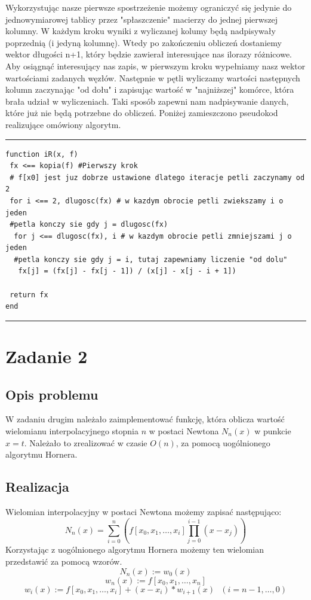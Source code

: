 \documentclass[]{article}
\begin{document}
Wykorzystując nasze pierwsze spostrzeżenie możemy ograniczyć się jedynie do jednowymiarowej tablicy przez "spłaszczenie" macierzy do jednej pierwszej kolumny. W każdym kroku wyniki z wyliczanej kolumy będą nadpisywały poprzednią (i jedyną kolumnę). Wtedy po zakończeniu obliczeń dostaniemy wektor długości n+1, który będzie zawierał interesujące nas ilorazy różnicowe. Aby osiągnąć interesujący nas zapis, w pierwszym kroku wypełniamy nasz wektor wartościami zadanych  węzłów. Następnie w pętli wyliczamy wartości następnych kolumn zaczynając "od dołu" i zapisując wartość w "najniższej" komórce, która brała udział w wyliczeniach. Taki sposób zapewni nam nadpisywanie danych, które już nie będą potrzebne do obliczeń. Poniżej zamieszczono pseudokod realizujące omówiony algorytm.
\\
\hrule
\begin{lstlisting}
function iR(x, f)
 fx <== kopia(f) #Pierwszy krok
 # f[x0] jest juz dobrze ustawione dlatego iteracje petli zaczynamy od 2	
 for i <== 2, dlugosc(fx) # w kazdym obrocie petli zwiekszamy i o jeden
 #petla konczy sie gdy j = dlugosc(fx)
  for j <== dlugosc(fx), i # w kazdym obrocie petli zmniejszami j o jeden
  #petla konczy sie gdy j = i, tutaj zapewniamy liczenie "od dolu"
   fx[j] = (fx[j] - fx[j - 1]) / (x[j] - x[j - i + 1])

 return fx
end
\end{lstlisting}
\hrule
\section{Zadanie 2}
\subsection{Opis problemu}
W zadaniu drugim należało zaimplementować funkcję, która oblicza wartość wielomianu interpolacyjnego stopnia $n$ w postaci Newtona $N_n(x)$ w punkcie $x=t$. Należało to zrealizować w czasie $O(n)$, za pomocą uogólnionego algorytmu Hornera.
\subsection{Realizacja}
Wielomian interpolacyjny w postaci Newtona możemy zapisać następująco:
\[ N_n(x) =  \sum_{i = 0}^{n}(f[x_0, x_1, \ldots, x_i] \prod_{j = 0}^{i - 1}(x - x_j) ) \]
Korzystając z uogólnionego algorytmu Hornera możemy ten wielomian przedstawić za pomocą wzorów.
\begin{equation}
	N_n(x) := w_0(x)
\end{equation} 
\begin{equation}
 w_n(x) := f[x_0, x_1, \ldots, x_n]
\end{equation} 
\begin{equation}
w_i(x) := f[x_0, x_1, \ldots, x_i] + (x-x_i)*w_{i+1}(x)\:\:\: (i = n-1, \ldots, 0)
\end{equation} 
\end{document}
